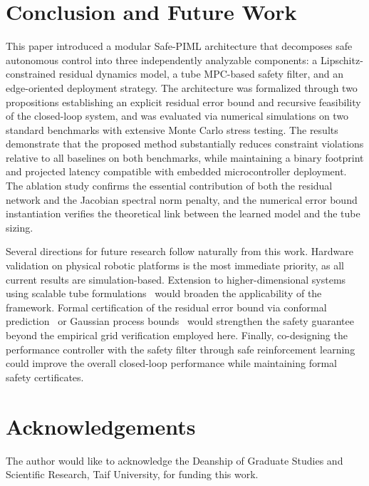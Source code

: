 \documentclass[12pt,a4paper]{article}
\begin{document}
\section{Conclusion and Future Work}
\label{sec:conclusion}

This paper introduced a modular Safe-PIML architecture that
decomposes safe autonomous control into three independently analyzable
components: a Lipschitz-constrained residual dynamics model, a tube
MPC-based safety filter, and an edge-oriented deployment strategy. The
architecture was formalized through two propositions establishing an
explicit residual error bound and recursive feasibility of the
closed-loop system, and was evaluated via numerical simulations on two
standard benchmarks with extensive Monte Carlo stress testing. The
results demonstrate that the proposed method substantially reduces
constraint violations relative to all baselines on both benchmarks,
while maintaining a binary footprint and projected latency compatible
with embedded microcontroller deployment. The ablation study confirms
the essential contribution of both the residual network and the
Jacobian spectral norm penalty, and the numerical error bound
instantiation verifies the theoretical link between the learned model
and the tube sizing.

Several directions for future research follow naturally from this work.
Hardware validation on physical robotic platforms is the most immediate
priority, as all current results are simulation-based. Extension to
higher-dimensional systems using scalable tube
formulations~\cite{gao2024rigid} would broaden the applicability of the
framework. Formal certification of the residual error bound via
conformal prediction~\cite{lindemann2023conformal} or Gaussian process
bounds~\cite{koller2022learning} would strengthen the safety guarantee
beyond the empirical grid verification employed here. Finally,
co-designing the performance controller with the safety filter through
safe reinforcement learning~\cite{gros2022learning} could improve the
overall closed-loop performance while maintaining formal safety
certificates.

\section{Acknowledgements}
The author would like to acknowledge the Deanship of Graduate Studies
and Scientific Research, Taif University, for funding this work.
\end{document}
